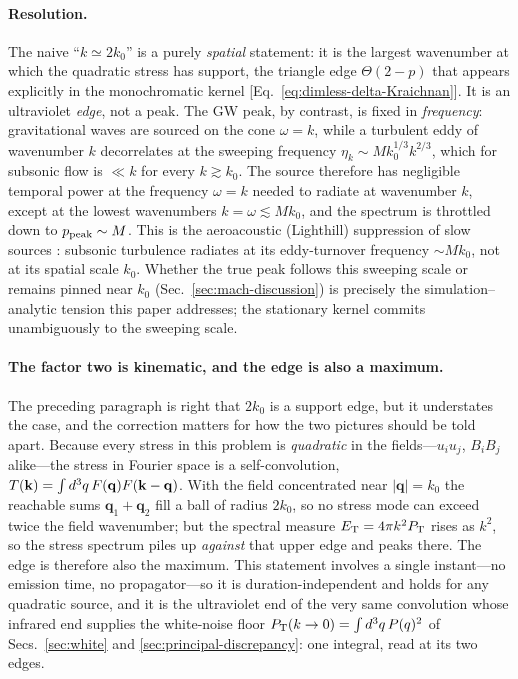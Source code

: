 \documentclass[10pt,prd,aps,nobibnotes,superscriptaddress,preprintnumbers,notitlepage]{revtex4-1}
\newcommand{\kb}{{\bf k}}
\begin{document}
\paragraph{Resolution.}
The naive ``$k\simeq2k_0$'' is a purely \emph{spatial} statement: it is the
largest wavenumber at which the quadratic stress has support, the triangle edge
$\Theta(2-p)$ that appears explicitly in the monochromatic kernel
[Eq.~\eqref{eq:dimless-delta-Kraichnan}]. It is an ultraviolet \emph{edge}, not a
peak. The GW peak, by contrast, is fixed in \emph{frequency}: gravitational waves
are sourced on the cone $\omega=k$, while a turbulent eddy of wavenumber $k$
decorrelates at the sweeping frequency $\eta_k\sim M k_0^{1/3}k^{2/3}$, which for
subsonic flow is $\ll k$ for every $k\gtrsim k_0$. The source therefore has
negligible temporal power at the frequency $\omega=k$ needed to radiate at
wavenumber $k$, except at the lowest wavenumbers $k=\omega\lesssim M k_0$, and the
spectrum is throttled down to $p_{\rm peak}\sim M$. This is the aeroacoustic
(Lighthill) suppression of slow sources \cite{Lighthill:1952,Proudman:1952}:
subsonic turbulence radiates at its eddy-turnover frequency $\sim M k_0$, not at
its spatial scale $k_0$. Whether the
true peak follows this sweeping scale or remains pinned near $k_0$
(Sec.~\ref{sec:mach-discussion}) is precisely the simulation--analytic tension
this paper addresses; the stationary kernel commits unambiguously to the sweeping
scale.

\paragraph{The factor two is kinematic, and the edge is also a maximum.}
The preceding paragraph is right that $2k_0$ is a support edge, but it understates
the case, and the correction matters for how the two pictures should be told apart.
Because every stress in this problem is \emph{quadratic} in the fields---$u_iu_j$,
$B_iB_j$ alike---the stress in Fourier space is a self-convolution,
$T(\kb)=\int d^3q\,F(\mathbf{q})F(\kb-\mathbf{q})$. With the field concentrated near
$|\mathbf{q}|=k_0$ the reachable sums $\mathbf{q}_1+\mathbf{q}_2$ fill a ball of radius
$2k_0$, so no stress mode can exceed twice the field wavenumber; but the spectral measure
$E_{\rm T}=4\pi k^2P_{\rm T}$ rises as $k^2$, so the stress spectrum piles up \emph{against}
that upper edge and peaks there. The edge is therefore also the maximum. This statement
involves a single instant---no emission time, no propagator---so it is duration-independent
and holds for any quadratic source, and it is the ultraviolet end of the very same
convolution whose infrared end supplies the white-noise floor
$P_{\rm T}(k\to0)=\int d^3q\,P(q)^2$ of Secs.~\ref{sec:white} and
\ref{sec:principal-discrepancy}: one integral, read at its two edges.
\end{document}
